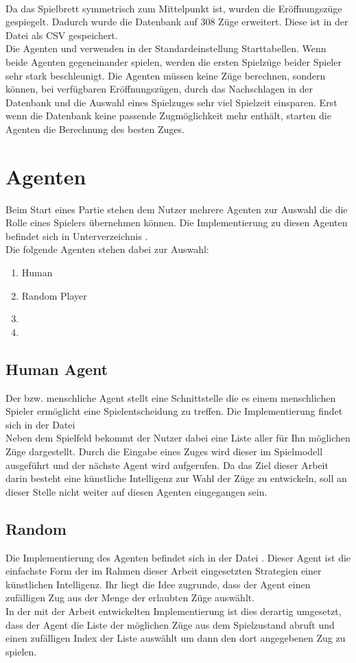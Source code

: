 \\Da das Spielbrett symmetrisch zum Mittelpunkt ist, wurden die Eröffnungszüge gespiegelt. Dadurch wurde die Datenbank auf 308 Züge erweitert. Diese ist in der Datei  als CSV gespeichert.
\\Die Agenten \mxZitat{\mc} und \mxZitat{\abp} verwenden in der Standardeinstellung Starttabellen. Wenn beide Agenten gegeneinander spielen, werden die ersten Spielzüge beider Spieler sehr stark beschleunigt. Die Agenten müssen keine Züge berechnen, sondern können, bei verfügbaren Eröffnungszügen, durch das Nachschlagen in der Datenbank und die Auswahl eines Spielzuges sehr viel Spielzeit einsparen. Erst wenn die Datenbank keine passende Zugmöglichkeit mehr enthält, starten die Agenten die Berechnung des besten Zuges.
\section{Agenten}
\label{agenten}
Beim Start eines Partie stehen dem Nutzer mehrere Agenten zur Auswahl die die Rolle eines Spielers übernehmen können. Die Implementierung zu diesen Agenten befindet sich in Unterverzeichnis .
\\Die folgende Agenten stehen dabei zur Auswahl:
\begin{enumerate}
\item Human
\item Random Player
\item \mc
\item \abp
\end{enumerate}
\subsection{Human Agent}
Der  bzw. menschliche Agent stellt eine Schnittstelle die es einem menschlichen Spieler ermöglicht eine Spielentscheidung zu treffen. Die Implementierung findet sich in der Datei 
\\Neben dem Spielfeld bekommt der Nutzer dabei eine Liste aller für Ihn möglichen Züge dargestellt. Durch die Eingabe eines Zuges wird dieser im Spielmodell ausgeführt und der nächste Agent wird aufgerufen. Da das Ziel dieser Arbeit darin besteht eine künstliche Intelligenz zur Wahl der Züge zu entwickeln, soll an dieser Stelle nicht weiter auf diesen Agenten eingegangen sein.

\subsection{Random}
Die Implementierung des Agenten  befindet sich in der Datei . Dieser Agent ist die einfachste Form der im Rahmen dieser Arbeit eingesetzten Strategien einer künstlichen Intelligenz. Ihr liegt die Idee zugrunde, dass der Agent einen zufälligen Zug aus der Menge der erlaubten Züge auswählt.
\\In der mit der Arbeit entwickelten Implementierung ist dies derartig umgesetzt, dass der Agent die Liste der möglichen Züge aus dem Spielzustand abruft und einen zufälligen Index der Liste auswählt um dann den dort angegebenen Zug zu spielen.

